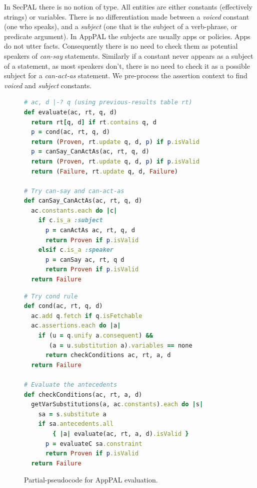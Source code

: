 \documentclass[a4paper]{scrartcl}
\begin{document}
In SecPAL there is no notion of type.
All entities are either constants (effectively strings) or variables.
There is no differentiation made between a \emph{voiced} constant (one who speaks),
and a \emph{subject} (one that is the subject of a verb-phrase, or predicate argument).
In AppPAL the subjects are usually apps or policies.
Apps do not utter facts.
Consequently there is no need to check them as potential speakers of \emph{can-say} statements.
Similarly if a constant never appears as a subject of a statement, as most speakers don't,
  there is no need to check it as a possible subject for a \emph{can-act-as} statement.
We pre-process the assertion context to find \emph{voiced} and \emph{subject} constants.

\begin{figure}
\begin{minipage}[b]{0.5\linewidth}
\begin{lstlisting}[language=Ruby, basicstyle=\ttfamily\scriptsize, keywordstyle=\scriptsize\slshape, columns=flexible]
# ac, d |-? q (using previous-results table rt)
def evaluate(ac, rt, q, d)
  return rt[q, d] if rt.contains q, d
  p = cond(ac, rt, q, d)
  return (Proven, rt.update q, d, p) if p.isValid 
  p = canSay_CanActAs(ac, rt, q, d)
  return (Proven, rt.update q, d, p) if p.isValid 
  return (Failure, rt.update q, d, Failure)

# Try can-say and can-act-as
def canSay_CanActAs(ac, rt, q, d)
  ac.constants.each do |c| 
    if c.is_a :subject
      p = canActAs ac, rt, q, d
      return Proven if p.isValid
    elsif c.is_a :speaker
      p = canSay ac, rt, q d
      return Proven if p.isValid
  return Failure
\end{lstlisting}
\end{minipage}
\begin{minipage}[b]{0.5\linewidth}
\begin{lstlisting}[language=Ruby, basicstyle=\ttfamily\scriptsize, keywordstyle=\scriptsize\slshape, columns=flexible]
# Try cond rule
def cond(ac, rt, q, d)
  ac.add q.fetch if q.isFetchable
  ac.assertions.each do |a|
    if (u = q.unify a.consequent) &&
       (a = u.substitution a).variables == none
      return checkConditions ac, rt, a, d
  return Failure
    
# Evaluate the antecedents
def checkConditions(ac, rt, a, d)
  getVarSubstitutions(a, ac.constants).each do |s|
    sa = s.substitute a
    if sa.antecedents.all 
        { |a| evaluate(ac, rt, a, d).isValid }
      p = evaluateC sa.constraint
      return Proven if p.isValid
  return Failure
\end{lstlisting}
\end{minipage}
\caption{Partial-pseudocode for AppPAL evaluation.}
\label{fig:pseudocode}
\end{figure}
\end{document}
